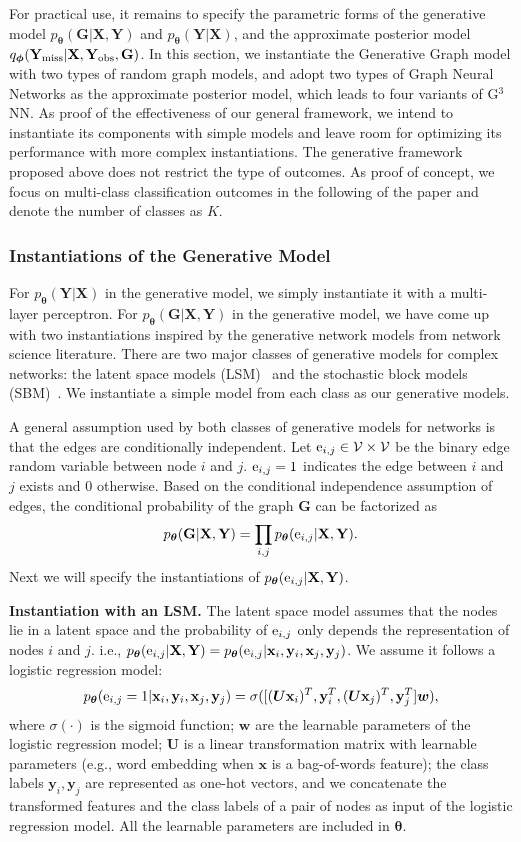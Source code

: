 \documentclass{article}
\newcommand{\vpara}[1]{\vspace{0.05in}\noindent\textbf{#1 }}
\def\re{{\textnormal{e}}}
\def\rvx{{\mathbf{x}}}
\def\rvy{{\mathbf{y}}}
\def\rmG{{\mathbf{G}}}
\def\rmX{{\mathbf{X}}}
\def\rmY{{\mathbf{Y}}}
\def\vtheta{{\bm{\theta}}}
\def\vw{{\bm{w}}}
\def\mU{{\bm{U}}}
\def\gV{{\mathcal{V}}}
\newcommand{\rYmiss}{\rmY_{\rm{miss}}}
\newcommand{\rYobs}{\rmY_{\rm{obs}}}
\def\vphi{{\bm{\phi}}}
\begin{document}
For practical use, it remains to specify the parametric forms of the generative model $p_{\vtheta}(\rmG|\rmX, \rmY)$ and $p_{\vtheta}(\rmY|\rmX)$, and the approximate posterior model $q_{\vphi}(\rYmiss|\rmX, \rYobs, \rmG)$. In this section, we instantiate the Generative Graph model with two types of random graph models, and adopt two types of Graph Neural Networks as the approximate posterior model, which leads to four variants of G$^3$NN. As proof of the effectiveness of our general framework, we intend to instantiate its components with simple models and leave room for optimizing its performance with more complex instantiations. The generative framework proposed above does not restrict the type of outcomes. As proof of concept, we focus on multi-class classification outcomes in the following of the paper and denote the number of classes as $K$.  

\subsubsection{Instantiations of the Generative Model}

For $p_{\vtheta}(\rmY|\rmX)$ in the generative model, we simply instantiate it with a multi-layer perceptron. For $p_{\vtheta}(\rmG|\rmX, \rmY)$ in the generative model, we have come up with two instantiations inspired by the generative network models from network science literature. There are two major classes of generative models for complex networks: the latent space models (LSM)~\cite{hoff2002latent} and the stochastic block models (SBM)~\cite{holland1983stochastic}. We instantiate a simple model from each class as our generative models. 

A general assumption used by both classes of generative models for networks is that the edges are conditionally independent. Let $\re_{i,j} \in \gV\times\gV$ be the binary edge random variable between node $i$ and $j$. $\re_{i,j} = 1$ indicates the edge between $i$ and $j$ exists and $0$ otherwise. Based on the conditional independence assumption of edges, the conditional probability of the graph $\rmG$ can be factorized as
$$p_{\vtheta}(\rmG|\rmX, \rmY) = \prod_{i,j}p_{\vtheta}(\re_{i,j}|\rmX, \rmY).$$
Next we will specify the instantiations of $p_{\vtheta}(\re_{i,j}|\rmX, \rmY)$.

\vpara{Instantiation with an LSM.} The latent space model assumes that the nodes lie in a latent space and the probability of $\re_{i,j}$ only depends the representation of nodes $i$ and $j$. i.e., $p_{\vtheta}(\re_{i,j}|\rmX, \rmY) = p_{\vtheta}(\re_{i,j}|\rvx_i, \rvy_i, \rvx_j, \rvy_j)$. We assume it follows a logistic regression model:
$$p_{\vtheta}(\re_{i,j} = 1|\rvx_i, \rvy_i, \rvx_j, \rvy_j) = \sigma([(\mU\rvx_i)^T, \rvy_i^T, (\mU\rvx_j)^T, \rvy_j^T]\vw),$$
where $\sigma(\cdot)$ is the sigmoid function; $\vw$ are the learnable parameters of the logistic regression model; $\mU$ is a linear transformation matrix with learnable parameters (e.g., word embedding when $\rvx$ is a bag-of-words feature); the class labels $\rvy_i, \rvy_j$ are represented as one-hot vectors, and we concatenate the transformed features and the class labels of a pair of nodes as input of the logistic regression model. All the learnable parameters are included in $\vtheta$.
\end{document}
